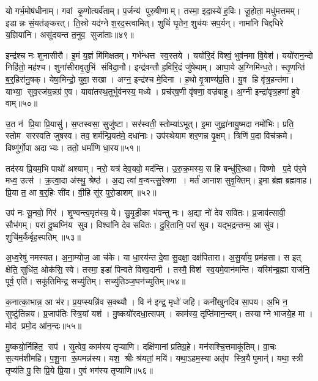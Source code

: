 यो गर्भ॒मोष॑धीनाम्।
गवां कृ॒णोत्यर्व॑ताम्।
प॒र्जन्य॑ पुरु॒षीणाम्।
तस्मा॒ इदा॒स्ये॑ ह॒विः।
जू॒होता॒ मधु॑मत्तमम्।
इडान्नः सं॒यत॑ङ्करत्।
ति॒स्रो यद॑ग्ने श॒रद॒स्त्वामित्।
शुचिं॑ घृ॒तेन॒ शुच॑यः सप॒र्यन्।
नामा॑नि चिद्दधिरे य॒ज्ञिया॑नि।
असू॑दयन्त त॒नुव॒ सुजा॑ताः॥४९॥

इन्द्र॑श्च नः शुनासीरौ।
इ॒मं य॒ज्ञं मि॑मिक्षतम्।
गर्भ॑न्धत्त स्व॒स्तये।
ययो॑रि॒दं विश्वं॒ भुव॑नमा वि॒वेश॑।
ययो॑रान॒न्दो निहि॑तो॒ मह॑श्च।
शुना॑सीरावृ॒तुभि॑ संविदा॒नौ।
इन्द्र॑वन्तौ ह॒विरि॒दं जु॑षेथाम्।
आघा॒ये अ॒ग्निमि॑न्ध॒ते।
स्तृ॒णन्ति॑ ब॒र्॒हिरा॑नु॒षक्।
येषा॒मिन्द्रो॒ युवा॒ सखा।
अग्न॒ इन्द्र॑श्च मे॒दिना।
ह॒थो वृ॒त्राण्य॑प्र॒ति।
यु॒व हि वृ॑त्र॒हन्त॑मा।
याभ्या॒ सुव॒रज॑य॒न्नग्र॑ ए॒व।
यावा॑तस्थ॒तुर्भुव॑नस्य॒ मध्ये।
प्रच॑र्‌ष॒णी वृ॑षणा॒ वज्र॑बाहू।
अ॒ग्नी इन्द्रा॑वृत्र॒हणा॑ हुवे वाम्॥५०॥\anuvakamend[मन॒ इन्द्रो॒ गवि॑ष्टिषु॒ तन्तु॒ङ्गर्भ॒ सुजा॑ता॒ सखा॑ स॒प्त च॑]

उ॒त न॑ प्रि॒या प्रि॒यासु॑।
स॒प्तस्वसा॒ सुजु॑ष्टा।
सर॑स्वती॒ स्तोम्या॑ऽभूत्।
इ॒मा जुह्वा॑नायु॒ष्मदा नमो॑भिः।
प्रति॒ स्तोम सरस्वति जुषस्व।
तव॒ शर्म॑न्प्रि॒यत॑मे॒ दधा॑नाः।
उप॑स्थेयाम शर॒णन्न वृ॒क्षम्।
त्रिणि॑ प॒दा विच॑क्रमे।
विष्णु॑र्गो॒पा अदाभ्यः।
ततो॒ धर्मा॑णि धा॒रय\sn{}॥५१॥

तद॑स्य प्रि॒यम॒भि पाथो॑ अश्याम्।
नरो॒ यत्र॑ देव॒यवो॒ मद॑न्ति।
उ॒रु॒क्र॒मस्य॒ स हि बन्धु॑रि॒त्था।
विष्णो प॒दे प॑र॒मे मध्व॒ उत्स॑।
क्र॒त्वा॒दा अ॑स्थु॒ श्रेष्ठ॑।
अ॒द्य त्वा॑ व॒न्वन्त्सु॒रेक्णा।
मर्त॑ आनाश सुवृ॒क्तिम्।
इ॒मा ब्र॑ह्म ब्रह्मवाह।
प्रि॒या त॒ आ ब॒र्॒हिः सी॑द।
वी॒हि सू॑र पुरो॒डाशम्॥५२॥

उप॑ नः सू॒नवो॒ गिर॑।
शृ॒ण्वन्त्व॒मृत॑स्य॒ ये।
सु॒मृ॒डी॒का भ॑वन्तु नः।
अ॒द्या नो॑ देव सवितः।
प्र॒जाव॑त्सावी॒ सौभ॑गम्।
परा॑ दु॒ष्वप्नि॑य सुव।
विश्वा॑नि देव सवितः।
दु॒रि॒तानि॒ परा॑ सुव।
यद्भ॒द्रन्तन्म॒ आ सु॑व।
शुचि॑म॒र्कैर्बृह॒स्पतिम्॥५३॥

अ॒ध्व॒रेषु॑ नमस्यत।
अ॒ना॒म्योज॒ आ च॑के।
या धा॒रय॑न्त दे॒वा सु॒दक्षा॒ दक्ष॑पितारा।
अ॒सु॒र्या॑य॒ प्रम॑हसा।
स इत् क्षेति॒ सुधि॑त॒ ओक॑सि॒ स्वे।
तस्मा॒ इडा॑ पिन्वते विश्व॒दानी।
तस्मै॒ विश॑ स्व॒यमे॒वान॑मन्ति।
यस्मि॑न्ब्र॒ह्मा राज॑नि॒ पूर्व॒ एति॑।
सकू॑तिमिन्द्र॒ सच्यु॑तिम्।
सच्यु॑तिञ्ज॒घन॑च्युतिम्॥५४॥

क॒नात्का॒भान्न॒ आ भ॑र।
प्र॒य॒प्स्यन्नि॑व स॒क्थ्यौ।
वि न॑ इन्द्र॒ मृधो॑ जहि।
कनी॑खुनदिव सा॒पय\sn{}।
अ॒भि न॒ सुष्टु॑तिन्नय।
प्र॒जाप॑तिः स्त्रि॒यां यश॑।
मु॒ष्कयो॑रदधा॒त्सपम्।
काम॑स्य॒ तृप्ति॑मान॒न्दम्।
तस्याग्ने भाजये॒ह मा।
मोद॑ प्रमो॒द आ॑न॒न्दः॥५५॥

मु॒ष्कयो॒र्निहि॑त॒ सप॑।
सृ॒त्वेव॒ काम॑स्य तृप्याणि।
दक्षि॑णानां प्रतिग्र॒हे।
मन॑सश्चि॒त्तमाकू॑तिम्।
वा॒चः स॒त्यम॑शीमहि।
प॒शू॒ना रू॒पमन्न॑स्य।
यश॒ श्रीः श्र॑यतां॒ मयि॑।
यथा॒ऽहम॒स्या अतृ॑प स्त्रि॒यै पुमान्॑।
यथा॒ स्त्री तृप्य॑ति पु॒सि प्रि॒ये प्रि॒या।
ए॒वं भग॑स्य तृप्याणि॥५६॥


